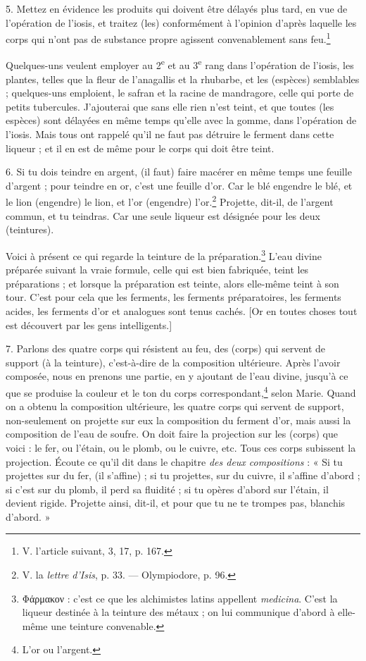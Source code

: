 \documentclass[a4paper, 11pt, oneside, polutonikogreek, french]{article}
\begin{document}
5. Mettez en évidence les produits qui doivent être délayés plus tard, en vue de l'opération de l'iosis, et traitez (les) conformément à l'opinion d'après laquelle les corps qui n'ont pas de substance propre agissent convenablement sans feu.\footnote{V. l'article suivant, 3, 17, p. 167.}

Quelques-uns veulent employer au 2\textsuperscript{e} et au 3\textsuperscript{e} rang dans l'opération de l'iosis, les plantes, telles que la fleur de l'anagallis et la rhubarbe, et les (espèces) semblables ; quelques-uns emploient, le safran et la racine de mandragore, celle qui porte de petits tubercules. J'ajouterai que sans elle rien n'est teint, et que toutes (les espèces) sont délayées en même temps qu'elle avec la gomme, dans l'opération de l'iosis. Mais tous ont rappelé qu'il ne faut pas détruire le ferment dans cette liqueur ; et il en est de même pour le corps qui doit être teint.

6. Si tu dois teindre en argent, (il faut) faire macérer en même temps une feuille d'argent ; pour teindre en or, c'est une feuille d'or. Car le blé engendre le blé, et le lion (engendre) le lion, et l'or (engendre) l'or.\footnote{V. la \emph{lettre d'Isis}, p. 33. --- Olympiodore, p. 96.} Projette, dit-il, de l'argent commun, et tu teindras. Car une seule liqueur est désignée pour les deux (teintures).

Voici à présent ce qui regarde la teinture de la préparation.\footnote{Φάρμακον : c'est ce que les alchimistes latins appellent \emph{medicina}. C'est la liqueur destinée à la teinture des métaux ; on lui communique d'abord à elle-même une teinture convenable.} L'eau divine préparée suivant la vraie formule, celle qui est bien fabriquée, teint les préparations ; et lorsque la préparation est teinte, alors elle-même teint à son tour. C'est pour cela que les ferments, les ferments préparatoires, les ferments acides, les ferments d'or et analogues sont tenus cachés. [Or en toutes choses tout est découvert par les gens intelligents.]

7. Parlons des quatre corps qui résistent au feu, des (corps) qui servent de support (à la teinture), c'est-à-dire de la composition ultérieure. Après l'avoir composée, nous en prenons une partie, en y ajoutant de l'eau divine, jusqu'à ce que se produise la couleur et le ton du corps correspondant,\footnote{L'or ou l'argent.} selon Marie. Quand on a obtenu la composition ultérieure, les quatre corps qui servent de support, non-seulement on projette sur eux la composition du ferment d'or, mais aussi la composition de l'eau de soufre. On doit faire la projection sur les (corps) que voici : le fer, ou l'étain, ou le plomb, ou le cuivre, etc. Tous ces corps subissent la projection. Écoute ce qu'il dit dans le chapitre \emph{des deux compositions} : « Si tu projettes sur du fer, (il s'affine) ; si tu projettes, sur du cuivre, il s'affine d'abord ; si c'est sur du plomb, il perd sa fluidité ; si tu opères d'abord sur l'étain, il devient rigide. Projette ainsi, dit-il, et pour que tu ne te trompes pas, blanchis d'abord. »
\end{document}
